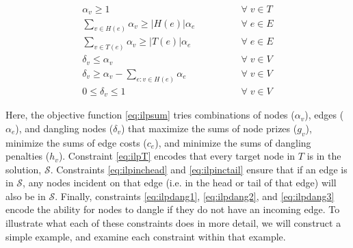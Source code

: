 \documentclass[12pt,twoside]{reedthesis}
\theoremstyle{definition}
\begin{document}
\begin{align}
 \alpha_v \geq 1 \qquad\qquad &\forall\; v \in T\label{eq:ilpT}\\
 \sum_{v \in H(e)} \alpha_v \geq \lvert H(e)\rvert \alpha_e \qquad\qquad &\forall\; e \in E\label{eq:ilpinchead}\\
 \sum_{v \in T(e)} \alpha_v \geq \lvert T(e)\rvert \alpha_e\qquad\qquad &\forall\; e \in E\label{eq:ilpinctail}\\
 \delta_v \leq \alpha_v \qquad\qquad &\forall\; v \in V\label{eq:ilpdang1}\\
 \delta_v \geq \alpha_{v} - \sum_{e:v \in H(e)} \alpha_e \qquad\qquad &\forall\; v \in V\label{eq:ilpdang2}\\
0 \leq \delta_v \leq 1 \qquad\qquad &\forall\; v \in V\label{eq:ilpdang3}%
\end{align}%


Here, the objective function \eqref{eq:ilpsum} tries combinations of nodes ($\alpha_v$), edges ($\alpha_e$), and dangling nodes ($\delta_v$) that maximize the sums of node prizes ($g_v$), minimize the sums of edge costs ($c_e$), and minimize the sums of dangling penalties ($h_v$). Constraint \eqref{eq:ilpT} encodes that every target node in $T$ is in the solution, $\mathcal{S}$.  Constraints \eqref{eq:ilpinchead} and \eqref{eq:ilpinctail} ensure that if an edge is in $\mathcal{S}$, any nodes incident on that edge (i.e. in the head or tail of that edge) will also be in $\mathcal{S}$.  Finally, constraints \eqref{eq:ilpdang1}, \eqref{eq:ilpdang2}, and \eqref{eq:ilpdang3} encode the ability for nodes to dangle if they do not have an incoming edge. To illustrate what each of these constraints does in more detail, we will construct a simple example, and examine each constraint within that example.\par
\end{document}
